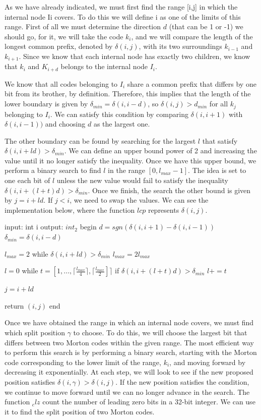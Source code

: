 \documentclass[titlepage,12pt]{report}
\begin{document}
As we have already indicated, we must first find the range [i,j] in which the internal node Ii covers. To do this we will define i as one of the limits of this range. First of all we must determine the direction $d$ (that can be 1 or -1) we should go, for it, we will take the code $k_i$, and we will compare the length of the longest common prefix, denoted by $\delta(i,j)$, with its two surroundings $k_{i-1}$ and $k_{i+1}$. Since we know that each internal node has exactly two children, we know that $k_i$ and $K_{i+d}$ belongs to the internal node $I_i$. 

We know that all codes belonging to $I_i$ share a common prefix that differs by one bit from its brother, by definition. Therefore, this implies that the length of the lower boundary is given by $\delta_{min} = \delta(i,i-d)$, so $\delta(i,j) > d_{min}$ for all $k_j$ belonging to $I_i$. We can satisfy this condition by comparing $\delta(i,i+1)$ with $\delta(i,i-1))$ and choosing $d$ as the largest one.

The other boundary can be found by searching for the largest $l$ that satisfy $\delta(i,i+ld) > \delta_{min}$. We can define an upper bound power of 2 and increasing the value until it no longer satisfy the inequality. Once we have this upper bound, we perform a binary search to find $l$ in the range $[0, l_{max}-1]$. The idea is set to one each bit of $l$ unless the new value would fail to satisfy the inequality $\delta(i, i + (l + t)d) > \delta_{min}$. Once we finish, the search the other bound is given by $j = i + ld$. If $j < i$, we need to swap the values. We can see the implementation below, where the function $lcp$ represents $\delta(i,j)$.

\begin{algorithm}[caption={range}, label={range_alg}]
input: int i
output: $int_2$
begin
  $d = sgn(\delta(i, i+1) - \delta(i, i-1))$
  $\delta_{min} = \delta(i, i-d)$
  
  $l_{max} = 2$  
  while $\delta(i, i+ld) > \delta_{min}$
    $l_{max} = 2l_{max}$

  $l = 0$
  while $t = [1, ... , \lceil \frac{l_{max}}{4} \rceil, \lceil \frac{l_{max}}{2}] \rceil$
    if $\delta(i, i + (l+t)d) > \delta_{min}$
      $l += t$
  
  $j = i + ld$
   
  return $(i,j)$
end
\end{algorithm}

Once we have obtained the range in which an internal node covers, we must find which split position $\gamma$ to choose. To do this, we will choose the largest bit that differs between two Morton codes within the given range. The most efficient way to perform this search is by performing a binary search, starting with the Morton code corresponding to the lower limit of the range, $k_i$, and moving forward by decreasing it exponentially. At each step, we will look to see if the new proposed position satisfies $\delta(i,\gamma) > \delta(i,j)$. If the new position satisfies the condition, we continue to move forward until we can no longer advance in the search. The function $_clz$ count the number of leading zero bits in a 32-bit integer. We can use it to find the split position of two Morton codes.
\end{document}

